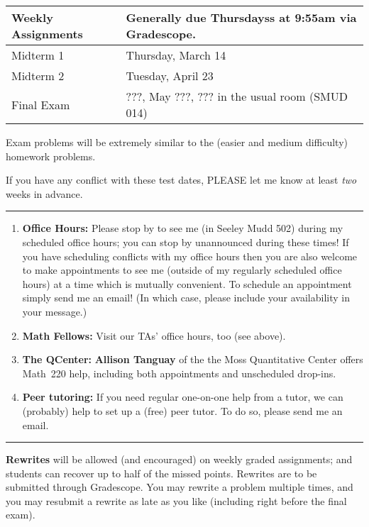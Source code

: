 \documentclass[12pt]{article}
\begin{document}
\begin{center}
 \begin{tabular}{|l|l|}
 \hline
 Weekly Assignments & Generally due Thursdayss at 9:55am via Gradescope.\\
 \hline
 Midterm 1 & Thursday, March 14 \\
 Midterm 2 & Tuesday, April 23 \\ 
   Final Exam & ???, May ???, ??? in the usual room (SMUD 014)	 \\
 \hline
 \end{tabular}
\end{center}

\noindent Exam problems will be extremely similar to the (easier and medium difficulty) homework problems.
\smallskip

\noindent If you have any conflict with these test dates, PLEASE let me know at least \emph{two} weeks in advance.

\medskip \hrule \medskip

\begin{enumerate}
\item[]{\bf Office Hours:} Please stop by to see me (in Seeley Mudd 502) during my scheduled office hours; you can stop by unannounced during these times! If you have scheduling conflicts with my office hours then you are also welcome to make appointments to see me (outside of my regularly scheduled office hours) at a time which is mutually convenient. To schedule an appointment simply send me an email! (In which case, please include your availability in your message.)
\item[] {\bf Math Fellows:} Visit our TAs' office hours, too (see above).
\item[] {\bf The QCenter:} \textbf{Allison Tanguay} of the the Moss Quantitative Center offers Math~220 help, including both appointments and unscheduled drop-ins.
\item[] {\bf Peer tutoring:} If you need regular one-on-one help from a tutor, we can (probably) help to set up a (free) peer tutor. To do so, please send me an email.
\end{enumerate}

\smallskip \hrule \medskip

\noindent\textbf{Rewrites} will be allowed (and encouraged) on weekly graded assignments;
 and students can recover up to half of the missed points. Rewrites
 are to be submitted through Gradescope. You may rewrite a problem
 multiple times, and you may resubmit a rewrite as late as you like
 (including right before the final exam).
\end{document}
